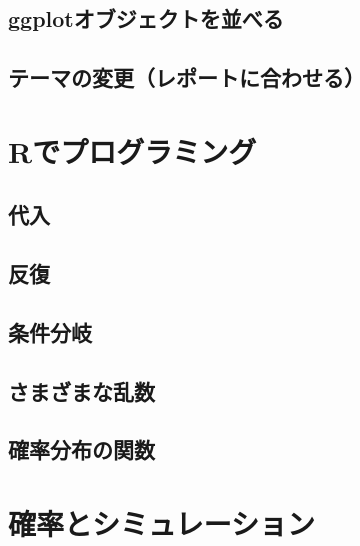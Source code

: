 \documentclass[
  a4paper,
]{ltjsbook}
\begin{document}
\section{ggplotオブジェクトを並べる}\label{ggplotux30aaux30d6ux30b8ux30a7ux30afux30c8ux3092ux4e26ux3079ux308b}

\section{テーマの変更（レポートに合わせる）}\label{ux30c6ux30fcux30deux306eux5909ux66f4ux30ecux30ddux30fcux30c8ux306bux5408ux308fux305bux308b}


\chapter{Rでプログラミング}\label{rux3067ux30d7ux30edux30b0ux30e9ux30dfux30f3ux30b0}

\section{代入}\label{ux4ee3ux5165}

\section{反復}\label{ux53cdux5fa9}

\section{条件分岐}\label{ux6761ux4ef6ux5206ux5c90}

\section{さまざまな乱数}\label{ux3055ux307eux3056ux307eux306aux4e71ux6570}

\section{確率分布の関数}\label{ux78baux7387ux5206ux5e03ux306eux95a2ux6570}


\chapter{確率とシミュレーション}\label{ux78baux7387ux3068ux30b7ux30dfux30e5ux30ecux30fcux30b7ux30e7ux30f3}
\end{document}
